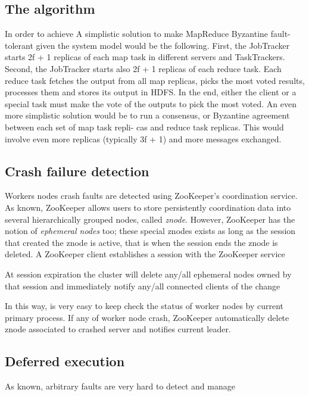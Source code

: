 \documentclass[sigchi]{acmart}
\begin{document}
\subsection{The algorithm}

In order to achieve 
A simplistic solution to make MapReduce
Byzantine fault-tolerant given the system model would be the
following. First, the JobTracker starts 2f + 1 replicas of each
map task in different servers and TaskTrackers. Second, the
JobTracker starts also 2f + 1 replicas of each reduce task.
Each reduce task fetches the output from all map replicas,
picks the most voted results, processes them and stores its
output in HDFS. In the end, either the client or a special task
must make the vote of the outputs to pick the most voted. An
even more simplistic solution would be to run a consensus,
or Byzantine agreement between each set of map task repli-
cas and reduce task replicas. This would involve even more
replicas (typically 3f + 1) and more messages exchanged.




\subsection{Crash failure detection} Workers nodes crash faults are detected using ZooKeeper's coordination service. As known, ZooKeeper allows users to store persistently coordination data into several hierarchically grouped nodes, called \textit{znode}. However, ZooKeeper has the notion of \textit{ephemeral nodes} too; these special znodes exists as long as the session that created the znode is active, that is when the session ends the znode is deleted. A ZooKeeper client establishes a session with the ZooKeeper service


At session expiration the cluster will delete any/all ephemeral nodes owned by that session and immediately notify any/all connected clients of the change 

In this way, is very easy to keep check the status of worker nodes by current primary process. If any of worker node crash, ZooKeeper automatically delete znode associated to crashed server and notifies current leader.

\subsection{Deferred execution} As known, arbitrary faults are very hard to detect and manage 
\end{document}
